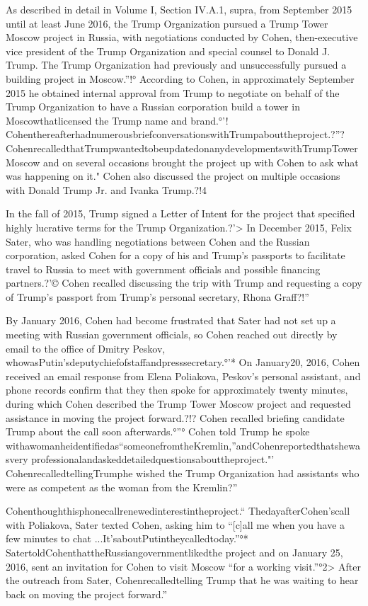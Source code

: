 As described in detail in Volume I, Section IV.A.1, supra, from September 2015 until at least June 2016, the Trump Organization pursued a Trump Tower Moscow project in Russia, with negotiations conducted by Cohen, then-executive vice president of the Trump Organization and special counsel to Donald J. Trump.%
The Trump Organization had previously and unsuccessfully pursued a building project in Moscow.”!°
According to Cohen, in approximately September 2015 he obtained internal approval from Trump to negotiate on behalf of the Trump Organization to have a Russian corporation build a tower in Moscowthatlicensed the Trump name and brand.°'!
CohenthereafterhadnumerousbriefconversationswithTrumpabouttheproject.?”?
CohenrecalledthatTrumpwantedtobeupdatedonanydevelopmentswithTrumpTowerMoscow and on several occasions brought the project up with Cohen to ask what was happening on it." Cohen also discussed the project on multiple occasions with Donald Trump Jr. and Ivanka Trump.?!4

In the fall of 2015, Trump signed a Letter of Intent for the project that specified highly lucrative terms for the Trump Organization.?'>
In December 2015, Felix Sater, who was handling negotiations between Cohen and the Russian corporation, asked Cohen for a copy of his and Trump's passports to facilitate travel to Russia to meet with government officials and possible financing partners.?'©
Cohen recalled discussing the trip with Trump and requesting a copy of Trump's passport from Trump's personal secretary, Rhona Graff?!”

By January 2016, Cohen had become frustrated that Sater had not set up a meeting with Russian government officials, so Cohen reached out directly by email to the office of Dmitry Peskov, whowasPutin'sdeputychiefofstaffandpresssecretary.°'*
On January20, 2016, Cohen received an email response from Elena Poliakova, Peskov's personal assistant, and phone records confirm that they then spoke for approximately twenty minutes, during which Cohen described the Trump Tower Moscow project and requested assistance in moving the project forward.?!?
Cohen recalled briefing candidate Trump about the call soon afterwards.°”°
Cohen told Trump he spoke withawomanheidentifiedas“someonefromtheKremlin,”andCohenreportedthatshewasvery professionalandaskeddetailedquestionsabouttheproject."'
CohenrecalledtellingTrumphe wished the Trump Organization had assistants who were as competent as the woman from the Kremlin?”

Cohenthoughthisphonecallrenewedinterestintheproject.“
ThedayafterCohen'scall with Poliakova, Sater texted Cohen, asking him to “[c]all me when you have a few minutes to chat ...It'saboutPutintheycalledtoday.”°*
SatertoldCohenthattheRussiangovernmentlikedthe project and on January 25, 2016, sent an invitation for Cohen to visit Moscow “for a working visit.”°2>
After the outreach from Sater, Cohenrecalledtelling Trump that he was waiting to hear back on moving the project forward.”

